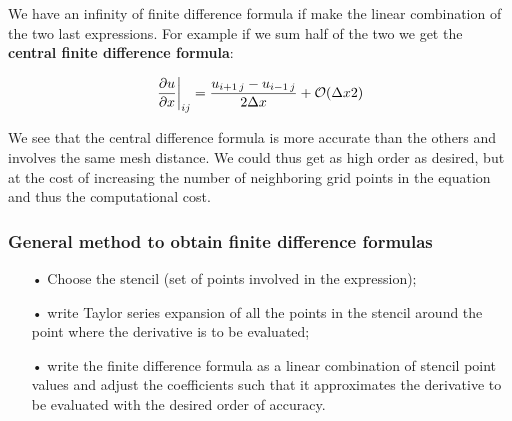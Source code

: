 We have an infinity of finite difference formula if make the linear combination of the two last expressions. For example if we sum half of the two we get the \textbf{central finite difference formula}: 

\begin{equation}
 \left.\frac{\partial u }{\partial x}\right| _{ij} = \frac{u_{i+1\, j} - u_{i-1\, j}}{2\Delta x} +\mathcal{O}(\Delta x2)
\end{equation}

We see that the central difference formula is more accurate than the others and involves the same mesh distance. We could thus get as high order as desired, but at the cost of increasing the number of neighboring grid points in the equation and thus the computational cost. 

\subsubsection{General method to obtain finite difference formulas}
\begin{itemize}
\item[•] Choose the stencil (set of points involved in the expression);
\item[•] write Taylor series expansion of all the points in the stencil around the point where the derivative is to be evaluated;
\item[•] write the finite difference formula as a linear combination of stencil point values and adjust the coefficients such that it approximates the derivative to be evaluated with the desired order of accuracy.
\end{itemize}


